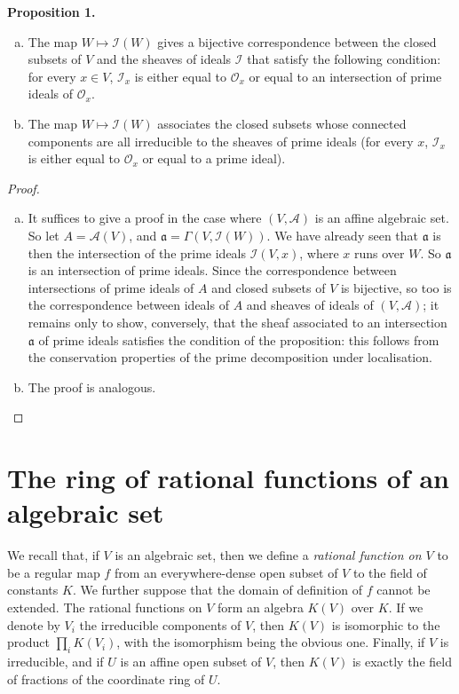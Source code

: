 \documentclass{article}
\newenvironment{itenv}[1]
  {\phantomsection\par\medskip\noindent\textbf{#1.}\itshape}
  {\medskip}
\newcommand{\scr}[1]{{\mathscr{#1}}}
\begin{document}
\begin{itenv}{Proposition 1}
\label{proposition1}
  \begin{enumerate}[(a)]
    \item The map $W\mapsto\scr{I}(W)$ gives a bijective correspondence between the closed subsets of $V$ and the sheaves of ideals $\scr{I}$ that satisfy the following condition:
      for every $x\in V$, $\scr{I}_x$ is either equal to $\scr{O}_x$ or equal to an intersection of prime ideals of $\scr{O}_x$.
    \item The map $W\mapsto\scr{I}(W)$ associates the closed subsets whose connected components are all irreducible to the sheaves of prime ideals (for every $x$, $\scr{I}_x$ is either equal to $\scr{O}_x$ or equal to a prime ideal).
  \end{enumerate}
\end{itenv}

\begin{proof}
  \begin{enumerate}[(a)]
    \item It suffices to give a proof in the case where $(V,\scr{A})$ is an affine algebraic set.
      So let $A=\scr{A}(V)$, and $\mathfrak{a}=\Gamma(V,\scr{I}(W))$.
      We have already seen that $\mathfrak{a}$ is then the intersection of the prime ideals $\scr{I}(V,x)$, where $x$ runs over $W$.
      So $\mathfrak{a}$ is an intersection of prime ideals.
      Since the correspondence between intersections of prime ideals of $A$ and closed subsets of $V$ is bijective, so too is the correspondence between ideals of $A$ and sheaves of ideals of $(V,\scr{A})$;
      it remains only to show, conversely, that the sheaf associated to an intersection $\mathfrak{a}$ of prime ideals satisfies the condition of the proposition: this follows from the conservation properties of the prime decomposition under localisation.
    \item The proof is analogous.
  \end{enumerate}
\end{proof}


\section{The ring of rational functions of an algebraic set}
\label{section3}

We recall that, if $V$ is an algebraic set, then we define a \emph{rational function on $V$} to be a regular map $f$ from an everywhere-dense open subset of $V$ to the field of constants $K$.
We further suppose that the domain of definition of $f$ cannot be extended.
The rational functions on $V$ form an algebra $K(V)$ over $K$.
If we denote by $V_i$ the irreducible components of $V$, then $K(V)$ is isomorphic to the product $\prod_i K(V_i)$, with the isomorphism being the obvious one.
Finally, if $V$ is irreducible, and if $U$ is an affine open subset of $V$, then $K(V)$ is exactly the field of fractions of the coordinate ring of $U$.
\end{document}
